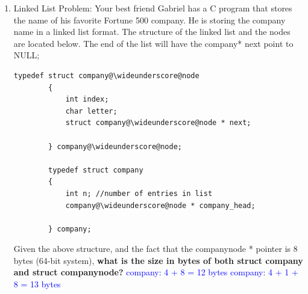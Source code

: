 \documentclass{article}
\newcommand{\wideunderscore}{\underline{\hphantom{n}}}
\begin{document}
\begin{enumerate}[label=(\alph*)]
Fill in the lines after line 17 needed to properly free the memory. Not all lines may be needed.

    \begin{lstlisting}[style=CStyle]
int main () {
    int a = 4;
    int d = 6;
    int c = 10;
    int ** b = new int * [5];  
    b[0] = &a;
    b[1] = &c;   
    b[2] = &d;
    b[3] = new int[6];
    b[3][0] = 5;
    b[3][2] = 8;
    b[3][1] = 17;
    b[3][5] = 2;
    b[3][4] = 9;
    b[3][3] = 22; 
    b[4] = new int(13);
    char * character = new char('k');
    @\textcolor{blue}{delete [] b[3];}@
    @\textcolor{blue}{delete b[4];}@
    @\textcolor{blue}{delete [] b;}@
    @\textcolor{blue}{delete character;}@
 }

    \end{lstlisting}

    Let’s say we have a void pointer p. What is the difference between delete [] p and delete p?

    \textcolor{blue}{ delete [] will free a contiguous array of memory, while delete frees only a single allocated block of memory of a particular data type. (e.g, an array of ints vs. a single int) }

    \item Linked List Problem:
    Your best friend Gabriel has a C program that stores the name of his favorite Fortune 500 company. He is storing the company name in a linked list format. The structure of the linked list and the nodes are located below. The end of the list will have the company\@\wideunderscore\@node * next point to NULL;

    \begin{lstlisting}[style = CStyle]
        typedef struct company@\wideunderscore@node
        {
            int index;
            char letter;
            struct company@\wideunderscore@node * next;
            
        } company@\wideunderscore@node;

        typedef struct company
        {
            int n; //number of entries in list
            company@\wideunderscore@node * company_head;
            
        } company;
    \end{lstlisting}

    Given the above structure, and the fact that the company\wideunderscore node * pointer is 8 bytes (64-bit system),
    \textbf{what is the size in bytes of both struct company and struct company\wideunderscore node?}
    \newline\textcolor{blue}{company: 4 + 8 = 12 bytes}
    \newline\textcolor{blue}{company\@\wideunderscore\@node: 4 + 1 + 8 = 13 bytes}


\end{enumerate}
\end{document}
